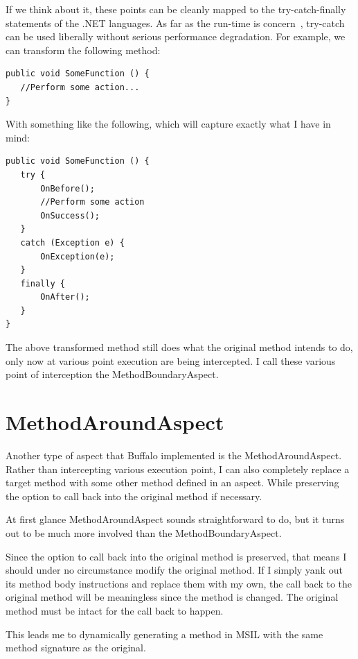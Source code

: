 If we think about it, these points can be cleanly mapped to the try-catch-finally statements of the .NET languages. As far as the run-time is concern~\cite{ecma334, ecma335}, try-catch can be used liberally without serious performance degradation. For example, we can transform the following method:

\begin{lstlisting}[caption={Sample function}, label=samplefunction]
public void SomeFunction () {
   //Perform some action...
}
\end{lstlisting}

With something like the following, which will capture exactly what I have in mind:

\begin{lstlisting}[caption={Sample try-catch-finally}, label=sampletcf]
public void SomeFunction () {
   try {
       OnBefore();
       //Perform some action
       OnSuccess();
   }
   catch (Exception e) {
       OnException(e);
   }
   finally {
       OnAfter();
   }
}
\end{lstlisting}

The above transformed method still does what the original method intends to do, only now at various point execution are being intercepted. I call these various point of interception the MethodBoundaryAspect.

\section{MethodAroundAspect}
Another type of aspect that Buffalo implemented is the MethodAroundAspect. Rather than intercepting various execution point, I can also completely replace a target method with some other method defined in an aspect. While preserving the option to call back into the original method if necessary.

At first glance MethodAroundAspect sounds straightforward to do, but it turns out to be much more involved than the MethodBoundaryAspect.

Since the option to call back into the original method is preserved, that means I should under no circumstance modify the original method. If I simply yank out its method body instructions and replace them with my own, the call back to the original method will be meaningless since the method is changed. The original method must be intact for the call back to happen.

This leads me to dynamically generating a method in MSIL with the same method signature as the original.

